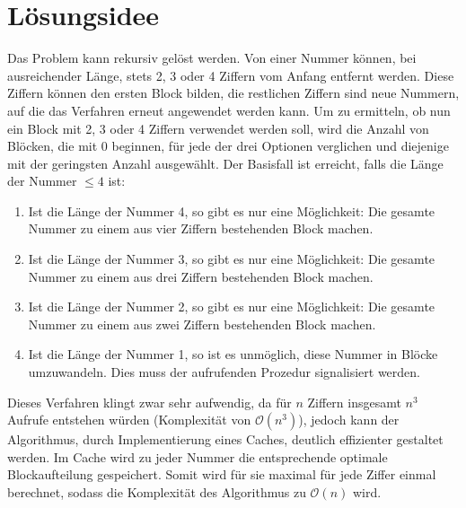 \documentclass[a4paper,10pt,ngerman]{scrartcl}
\title{\Aufgabe}
\author{\Name\\Einsendenummer: \Einsendenummer}
\date{\today}
\begin{document}
\maketitle
\tableofcontents

\section{Lösungsidee}
Das Problem kann rekursiv gelöst werden.
Von einer Nummer können, bei ausreichender Länge, stets 2, 3 oder 4 Ziffern vom Anfang entfernt werden.
Diese Ziffern können den ersten Block bilden, die restlichen Ziffern sind neue Nummern, auf die das Verfahren erneut angewendet werden kann.
Um zu ermitteln, ob nun ein Block mit 2, 3 oder 4 Ziffern verwendet werden soll, wird die Anzahl von Blöcken, die mit 0 beginnen, für jede der drei Optionen verglichen und diejenige mit der geringsten Anzahl ausgewählt.
Der Basisfall ist erreicht, falls die Länge der Nummer $\le 4$ ist:
\begin{enumerate}
    \item Ist die Länge der Nummer 4, so gibt es nur eine Möglichkeit: Die gesamte Nummer zu einem aus vier Ziffern bestehenden Block machen.
    \item Ist die Länge der Nummer 3, so gibt es nur eine Möglichkeit: Die gesamte Nummer zu einem aus drei Ziffern bestehenden Block machen.
    \item Ist die Länge der Nummer 2, so gibt es nur eine Möglichkeit: Die gesamte Nummer zu einem aus zwei Ziffern bestehenden Block machen.
    \item Ist die Länge der Nummer 1, so ist es unmöglich, diese Nummer in Blöcke umzuwandeln. Dies muss der aufrufenden Prozedur signalisiert werden.
\end{enumerate}

Dieses Verfahren klingt zwar sehr aufwendig, da für $n$ Ziffern insgesamt $n^3$ Aufrufe entstehen würden (Komplexität von $\mathcal{O}(n^3)$), jedoch kann der Algorithmus, durch Implementierung eines Caches, deutlich effizienter gestaltet werden.
Im Cache wird zu jeder Nummer die entsprechende optimale Blockaufteilung gespeichert.
Somit wird für sie maximal für jede Ziffer einmal berechnet, sodass die Komplexität des Algorithmus zu $\mathcal{O}(n)$ wird.
\end{document}
